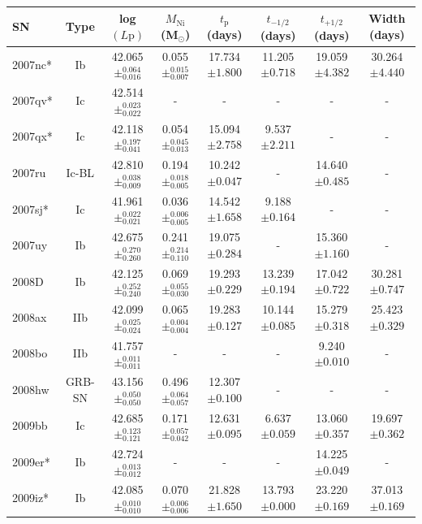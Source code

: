 \documentclass[a4paper,fleqn,usenatbib]{mnras}
\begin{document}
\begin{table}
\renewcommand{\arraystretch}{1.5}
 \centering
 \begin{minipage}{160mm}
 \begin{tabular}{lccccccc}
  \hline
  SN & Type & log$(L{\mathrm{p}})$ &$M_{\mathrm{Ni}}$ (M$_{\odot}$) &$t_{\mathrm{p}}$ (days) & $t_{-1/2}$ (days) & $t_{+1/2}$ (days) & Width (days) \\
  \hline
2007nc* & Ib & 42.065$\pm^{0.064}_{0.016}$ & 0.055$\pm^{0.015}_{0.007}$ & 17.734$\pm{1.800}$ & 11.205$\pm 0.718$ & 19.059$\pm 4.382$ & 30.264$\pm 4.440$\\  
2007qv* & Ic & 42.514$\pm^{0.023}_{0.022}$ & - & - & - & - & -\\
2007qx* & Ic & 42.118$\pm^{0.197}_{0.041}$ & 0.054$\pm^{0.045}_{0.013}$ & 15.094$\pm{2.758}$ & 9.537$\pm 2.211$ & - & -\\
2007ru & Ic-BL & 42.810$\pm^{0.038}_{0.009}$ & 0.194$\pm^{0.018}_{0.005}$ & 10.242$\pm{0.047}$ & - & 14.640$\pm 0.485$ & -\\
2007sj* & Ic & 41.961$\pm^{0.022}_{0.021}$ & 0.036$\pm^{0.006}_{0.005}$ & 14.542$\pm{1.658}$ & 9.188$\pm 0.164$ & - & -\\
2007uy & Ib & 42.675$\pm^{0.270}_{0.260}$ & 0.241$\pm^{0.214}_{0.110}$ & 19.075$\pm{0.284}$ & - & 15.360$\pm 1.160$ & -\\
2008D & Ib & 42.125$\pm^{0.252}_{0.240}$ & 0.069$\pm^{0.055}_{0.030}$ & 19.293$\pm{0.229}$ & 13.239$\pm 0.194$ & 17.042$\pm 0.722$ & 30.281$\pm 0.747$\\
2008ax & IIb & 42.099$\pm^{0.025}_{0.024}$ & 0.065$\pm^{0.004}_{0.004}$ & 19.283$\pm{0.127}$ & 10.144$\pm 0.085$ & 15.279$\pm 0.318$ & 25.423$\pm 0.329$\\
2008bo & IIb & 41.757$\pm^{0.011}_{0.011}$ & - & - & - & 9.240$\pm 0.010$ & -\\
2008hw & GRB-SN & 43.156$\pm^{0.050}_{0.050}$ & 0.496$\pm^{0.064}_{0.057}$ & 12.307$\pm{0.100}$ & - & - & -\\
2009bb & Ic & 42.685$\pm^{0.123}_{0.121}$ & 0.171$\pm^{0.057}_{0.042}$ & 12.631$\pm{0.095}$ & 6.637$\pm 0.059$ & 13.060$\pm 0.357$ & 19.697$\pm 0.362$\\
2009er* & Ib & 42.724$\pm^{0.013}_{0.012}$ & - & - & - & 14.225$\pm 0.049$ & -\\
2009iz* & Ib & 42.085$\pm^{0.010}_{0.010}$ & 0.070$\pm^{0.006}_{0.006}$ & 21.828$\pm{1.650}$ & 13.793$\pm 0.000$ & 23.220$\pm 0.169$ & 37.013$\pm 0.169$\\

\end{tabular}
\end{minipage}
\end{table}
\end{document}
